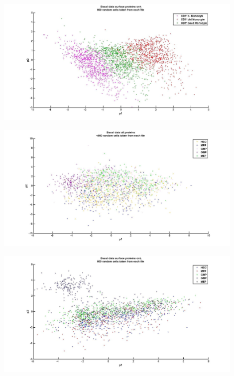 \documentclass{article} %
\begin{document}
\begin{minipage}{\linewidth}
\centering
  \includegraphics[width=120mm]{Basal_SurfaceProtein_Monocytes.jpg}
\end{minipage}

\begin{minipage}{\linewidth}
\centering
  \includegraphics[width=120mm]{Basal_AllProtein_StemCells.jpg}
\end{minipage}

\begin{minipage}{\linewidth}
\centering
  \includegraphics[width=120mm]{Basal_SurfaceProtein_StemCells.jpg}
\end{minipage}
\end{document}
